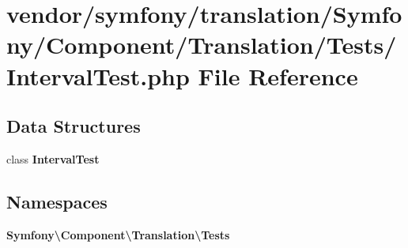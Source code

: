 \section{vendor/symfony/translation/\+Symfony/\+Component/\+Translation/\+Tests/\+Interval\+Test.php File Reference}
\label{_interval_test_8php}
\subsection*{Data Structures}
\begin{DoxyCompactItemize}
\item 
class {\bf Interval\+Test}
\end{DoxyCompactItemize}
\subsection*{Namespaces}
\begin{DoxyCompactItemize}
\item 
 {\bf Symfony\textbackslash{}\+Component\textbackslash{}\+Translation\textbackslash{}\+Tests}
\end{DoxyCompactItemize}
